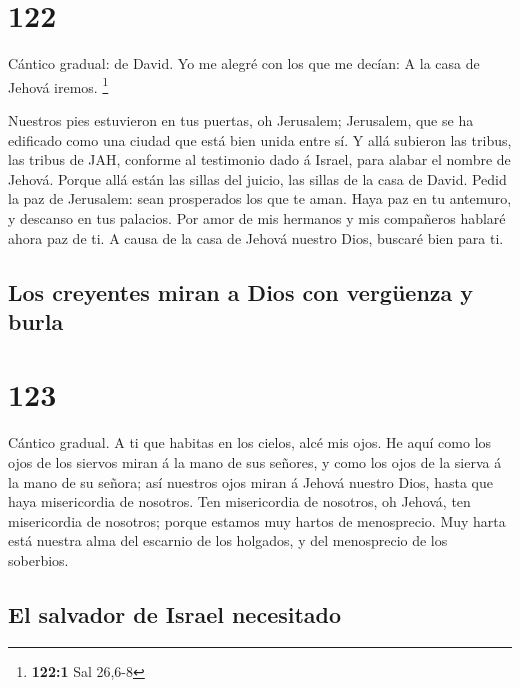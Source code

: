 \hypertarget{section-121}{%
\section{122}\label{section-121}}

 Cántico gradual: de David. Yo me alegré con los que me
decían: A la casa de Jehová iremos. \footnote{\textbf{122:1} Sal 26,6-8}

 Nuestros pies estuvieron en tus puertas, oh Jerusalem;
 Jerusalem, que se ha edificado como una ciudad que está
bien unida entre sí.  Y allá subieron las tribus, las tribus
de JAH, conforme al testimonio dado á Israel, para alabar el nombre de
Jehová.  Porque allá están las sillas del juicio, las sillas
de la casa de David.  Pedid la paz de Jerusalem: sean
prosperados los que te aman.  Haya paz en tu antemuro, y
descanso en tus palacios.  Por amor de mis hermanos y mis
compañeros hablaré ahora paz de ti.  A causa de la casa de
Jehová nuestro Dios, buscaré bien para ti.

\hypertarget{los-creyentes-miran-a-dios-con-verguxfcenza-y-burla}{%
\subsection{Los creyentes miran a Dios con vergüenza y
burla}\label{los-creyentes-miran-a-dios-con-verguxfcenza-y-burla}}

\hypertarget{section-122}{%
\section{123}\label{section-122}}

 Cántico gradual. A ti que habitas en los cielos, alcé mis
ojos.  He aquí como los ojos de los siervos miran á la mano
de sus señores, y como los ojos de la sierva á la mano de su señora; así
nuestros ojos miran á Jehová nuestro Dios, hasta que haya misericordia
de nosotros.  Ten misericordia de nosotros, oh Jehová, ten
misericordia de nosotros; porque estamos muy hartos de menosprecio.
 Muy harta está nuestra alma del escarnio de los holgados, y
del menosprecio de los soberbios.

\hypertarget{el-salvador-de-israel-necesitado}{%
\subsection{El salvador de Israel
necesitado}\label{el-salvador-de-israel-necesitado}}

